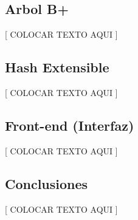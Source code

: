 \documentclass{article}
\begin{document}
\subsection{Arbol B+}

	[ COLOCAR TEXTO AQUI ]
\bigskip



\subsection{Hash Extensible}

	[ COLOCAR TEXTO AQUI ]
\bigskip



\subsection{Front-end (Interfaz)}

	[ COLOCAR TEXTO AQUI ]
\bigskip




\subsection{Conclusiones}

	[ COLOCAR TEXTO AQUI ]
\bigskip





\end{document}
